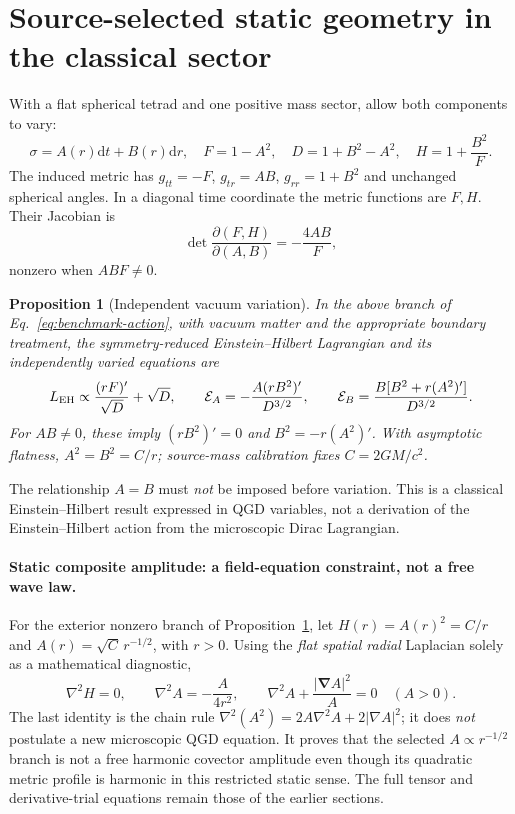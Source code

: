 \documentclass[11pt,a4paper]{article}
\newcommand{\dd}{\mathrm d}
\newtheorem{proposition}[theorem]{Proposition}
\begin{document}
\section{Source-selected static geometry in the classical sector}\label{sec:static-source}
With a flat spherical tetrad and one positive mass sector, allow both components to vary:
\begin{equation}\label{eq:spherical-sigma}
\sigma=A(r)\dd t+B(r)\dd r,\quad
F=1-A^2,\quad D=1+B^2-A^2,\quad
H=1+\frac{B^2}{F}.
\end{equation}
The induced metric has $g_{tt}=-F$, $g_{tr}=AB$, $g_{rr}=1+B^2$ and unchanged spherical angles. In a diagonal time coordinate the metric functions are $F,H$. Their Jacobian is
\begin{equation}\label{eq:spherical-jacobian}
\det\frac{\partial(F,H)}{\partial(A,B)}=-\frac{4AB}{F},
\end{equation}
nonzero when $ABF\ne0$.

\begin{proposition}[Independent vacuum variation]\label{prop:vacuum-schwarzschild}
In the above branch of Eq.~\eqref{eq:benchmark-action}, with vacuum matter and the appropriate boundary treatment, the symmetry-reduced Einstein--Hilbert Lagrangian and its independently varied equations are
\begin{equation}\label{eq:static-EH}
L_{\rm EH}\propto \frac{(rF)'}{\sqrt D}+\sqrt D,\qquad
\mathcal E_A=-\frac{A(rB^2)'}{D^{3/2}},\qquad
\mathcal E_B=\frac{B[B^2+r(A^2)']}{D^{3/2}}.
\end{equation}
For $AB\ne0$, these imply $(rB^2)'=0$ and $B^2=-r(A^2)'$. With asymptotic flatness, $A^2=B^2=C/r$; source-mass calibration fixes $C=2GM/c^2$.
\end{proposition}
The relationship $A=B$ must \emph{not} be imposed before variation. This is a classical Einstein--Hilbert result expressed in QGD variables, not a derivation of the Einstein--Hilbert action from the microscopic Dirac Lagrangian.


\paragraph{Static composite amplitude: a field-equation constraint, not a free wave law.}
For the exterior nonzero branch of Proposition~\ref{prop:vacuum-schwarzschild}, let $H(r)=A(r)^2=C/r$ and $A(r)=\sqrt C\,r^{-1/2}$, with $r>0$.  Using the \emph{flat spatial radial} Laplacian solely as a mathematical diagnostic,
\begin{equation}\label{eq:qgd064-composite-harmonic}
\boxed{\nabla^2H=0,\qquad \nabla^2A=-\frac{A}{4r^2},\qquad
\nabla^2A+\frac{|\bm\nabla A|^2}{A}=0\quad(A>0).}
\end{equation}
The last identity is the chain rule $\nabla^2(A^2)=2A\nabla^2A+2|\nabla A|^2$; it does \emph{not} postulate a new microscopic QGD equation. It proves that the selected $A\propto r^{-1/2}$ branch is not a free harmonic covector amplitude even though its quadratic metric profile is harmonic in this restricted static sense. The full tensor and derivative-trial equations remain those of the earlier sections.
\end{document}
